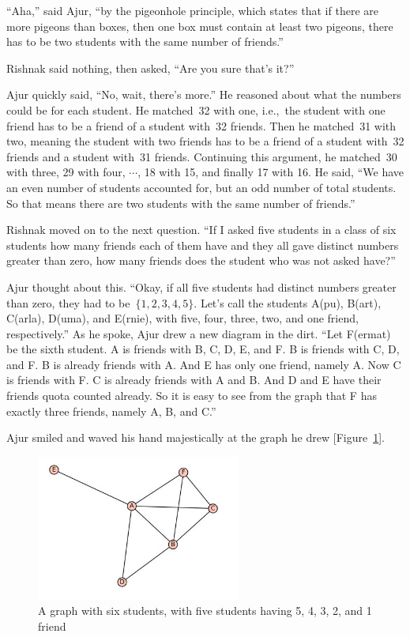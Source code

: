 ``Aha,'' said Ajur, ``by the pigeonhole principle, which states that if there are more pigeons than boxes, then one box must contain at least two pigeons, there has to be two students with the same number of friends.''

Rishnak said nothing, then asked, ``Are you sure that's it?''

Ajur quickly said, ``No, wait, there's more.''  He reasoned about what the numbers could be for each student. He matched~32 with one, i.e.,~the student with one friend has to be a friend of a student with~32 friends. Then he matched~31 with two, meaning the student with two friends has to be a friend of a student with~32 friends and a student with~31 friends. Continuing this argument, he matched~30 with three, 29 with four, $\cdots$, 18 with 15, and finally 17 with 16. He said, ``We have an even number of students accounted for, but an odd number of total students. So that means there are two students with the same number of friends.''

Rishnak moved on to the next question. ``If I asked five students in a class of six students how many friends each of them have and they all gave distinct numbers greater than zero, how many friends does the student who was not asked have?''

Ajur thought about this. ``Okay, if all five students had distinct numbers greater than zero, they had to be~$\{1,2,3,4,5\}$. Let's call the students A(pu), B(art), C(arla), D(uma), and E(rnie), with five, four, three, two, and one friend, respectively.''  As he spoke, Ajur drew a new diagram in the dirt. ``Let F(ermat) be the sixth student. A is friends with B, C, D, E, and F. B is friends with C, D, and F. B is already friends with A. And E has only one friend, namely A. Now C is friends with F. C is already friends with A and B. And D and E have their friends quota counted already. So it is easy to see from the graph that F has exactly three friends, namely A, B, and C.''

Ajur smiled and waved his hand majestically at the graph he drew [Figure~\ref{dg2}].

\begin{figure}
\begin{center}
\includegraphics[width=0.6\textwidth]{graphstory1-1.JPG}
\caption{A graph with six students, with five students having 5, 4, 3, 2, and 1 friend}\label{dg2}
\end{center}
\end{figure}

